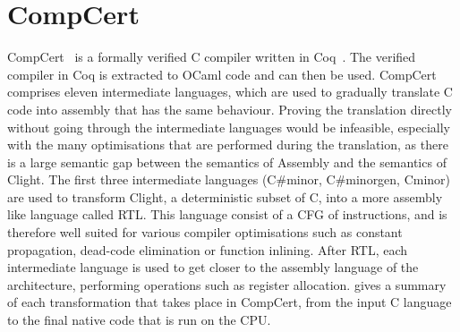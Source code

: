 \section{CompCert}%
\label{sec:bg:compcert}

\gls{CompCert}~\cite{leroy06_formal_certif_compil_back_end,leroy09_formal_verif_realis_compil,leroy16_cfvoc}
is a formally verified C compiler written in
Coq~\cite{bertot04_inter_theor_provin_progr_devel}.  The verified compiler in
Coq is extracted to OCaml code and can then be used.  CompCert comprises eleven
intermediate languages, which are used to gradually translate C code into
assembly that has the same behaviour.  Proving the translation directly without
going through the intermediate languages would be infeasible, especially with
the many optimisations that are performed during the translation, as there is a
large semantic gap between the semantics of Assembly and the semantics of
Clight.  The first three intermediate languages (C\#minor, C\#minorgen, Cminor)
are used to transform Clight, a deterministic subset of C, into a more assembly
like language called \gls{RTL}.  This language consist of a \gls{CFG} of
instructions, and is therefore well suited for various compiler optimisations
such as constant propagation, dead-code elimination or function inlining.  After
\gls{RTL}, each intermediate language is used to get closer to the assembly
language of the architecture, performing operations such as register allocation.
 gives a summary of each transformation that
takes place in CompCert, from the input C language to the final native code that
is run on the \gls{CPU}.



